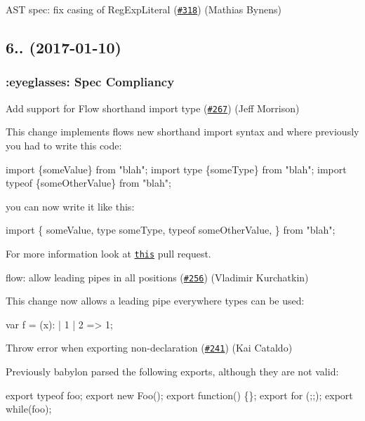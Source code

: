 A\+ST spec\+: fix casing of {\ttfamily Reg\+Exp\+Literal} (\href{https://github.com/babel/babylon/pull/318}{\tt \#318}) (Mathias Bynens)

\subsection*{6.. (2017-\/01-\/10)}

\subsubsection*{\+:eyeglasses\+: Spec Compliancy}

Add support for Flow shorthand import type (\href{https://github.com/babel/babylon/pull/267}{\tt \#267}) (Jeff Morrison)

This change implements flows new shorthand import syntax and where previously you had to write this code\+:


\begin{DoxyCode}
import \{someValue\} from "blah";
import type \{someType\} from "blah";
import typeof \{someOtherValue\} from "blah";
\end{DoxyCode}


you can now write it like this\+:


\begin{DoxyCode}
import \{
  someValue,
  type someType,
  typeof someOtherValue,
\} from "blah";
\end{DoxyCode}


For more information look at \href{https://github.com/facebook/flow/pull/2890}{\tt this} pull request.

flow\+: allow leading pipes in all positions (\href{https://github.com/babel/babylon/pull/256}{\tt \#256}) (Vladimir Kurchatkin)

This change now allows a leading pipe everywhere types can be used\+: 
\begin{DoxyCode}
var f = (x): | 1 | 2 => 1;
\end{DoxyCode}


Throw error when exporting non-\/declaration (\href{https://github.com/babel/babylon/pull/241}{\tt \#241}) (Kai Cataldo)

Previously babylon parsed the following exports, although they are not valid\+: 
\begin{DoxyCode}
export typeof foo;
export new Foo();
export function() \{\};
export for (;;);
export while(foo);
\end{DoxyCode}


